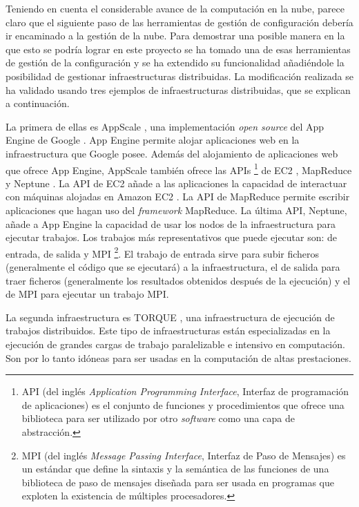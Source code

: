 Teniendo en cuenta el considerable avance de la computación en la nube, parece claro que el siguiente paso de las herramientas de gestión de configuración debería ir encaminado a la gestión de la nube. Para demostrar una posible manera en la que esto se podría lograr en este proyecto se ha tomado una de esas herramientas de gestión de la configuración y se ha extendido su funcionalidad añadiéndole la posibilidad de gestionar infraestructuras distribuidas. La modificación realizada se ha validado usando tres ejemplos de infraestructuras distribuidas, que se explican a continuación.

La primera de ellas es AppScale \cite{appscale}, una implementación \emph{open source} del App Engine de Google \cite{appengine}. App Engine permite alojar aplicaciones web en la infraestructura que Google posee. Además del alojamiento de aplicaciones web que ofrece App Engine, AppScale también ofrece las APIs \footnote[1]{API (del inglés \emph{Application Programming Interface}, Interfaz de programación de aplicaciones) es el conjunto de funciones y procedimientos que ofrece una biblioteca para ser utilizado por otro \emph{software} como una capa de abstracción.} de EC2 \cite{appscale-ec2}, MapReduce \cite{appscale-mapreduce} y Neptune \cite{appscale-neptune}. La API de EC2 añade a las aplicaciones la capacidad de interactuar con máquinas alojadas en Amazon EC2 \cite{amazon-ec2}. La API de MapReduce permite escribir aplicaciones que hagan uso del \emph{framework} MapReduce. La última API, Neptune, añade a App Engine la capacidad de usar los nodos de la infraestructura para ejecutar trabajos. Los trabajos más representativos que puede ejecutar son: de entrada, de salida y MPI \footnote[2]{MPI (del inglés \emph{Message Passing Interface}, Interfaz de Paso de Mensajes) es un estándar que define la sintaxis y la semántica de las funciones de una biblioteca de paso de mensajes diseñada para ser usada en programas que exploten la existencia de múltiples procesadores.}. El trabajo de entrada sirve para subir ficheros (generalmente el código que se ejecutará) a la infraestructura, el de salida para traer ficheros (generalmente los resultados obtenidos después de la ejecución) y el de MPI para ejecutar un trabajo MPI.

La segunda infraestructura es TORQUE \cite{Staples:2006:TRM:1188455.1188464, torque}, una infraestructura de ejecución de trabajos distribuidos. Este tipo de infraestructuras están especializadas en la ejecución de grandes cargas de trabajo paralelizable e intensivo en computación. Son por lo tanto idóneas para ser usadas en la computación de altas prestaciones.

